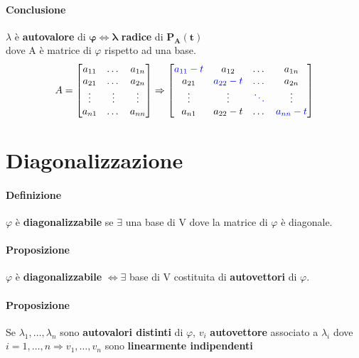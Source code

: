 \documentclass[a4paper, 12pt]{report}
\begin{document}
            \paragraph{Conclusione}$\lambda$ è \textbf{autovalore} di $\boldsymbol{\varphi} \Leftrightarrow \boldsymbol{\lambda}$ \textbf{radice} di $\boldsymbol{P_A(t)}$\\
            dove A è matrice di $\varphi$ rispetto ad una base.
            $$
            A=
            \begin{bmatrix}
                a_{11}& \dots&a_{1n}\\
                a_{21}& \dots&a_{2n}\\
                \vdots& \vdots & \vdots\\
                a_{n1}&\dots&a_{nn}
            \end{bmatrix}
            \Rightarrow
            \begin{bmatrix}
                \textcolor{blue}{a_{11}-t} & a_{12} & \dots & a_{1n}\\
                a_{21} & \textcolor{blue}{a_{22}-t} & \dots & a_{2n}\\
                \vdots & \vdots & \textcolor{blue}{\ddots} & \vdots\\
                a_{n1} & a_{22}-t & \dots & \textcolor{blue}{a_{nn}-t}\\
            \end{bmatrix}
            $$
        \clearpage
        \section{Diagonalizzazione}
            \paragraph{Definizione}$\varphi$ è \textbf{diagonalizzabile} se $\exists$ una base di V dove la matrice di $\varphi$ è diagonale.
            \paragraph{Proposizione}$\varphi$ è \textbf{diagonalizzabile} $\Leftrightarrow \exists$ base di V costituita di \textbf{autovettori} di $\varphi$.
            \paragraph{Proposizione}Se $\lambda_1,\dots,\lambda_n$ sono \textbf{autovalori distinti} di $\varphi$, $v_i$
            \textbf{autovettore} associato a $\lambda_i$ dove $i=1,\dots,n \Rightarrow v_1,\dots,v_n$ sono \textbf{linearmente indipendenti}
\end{document}
